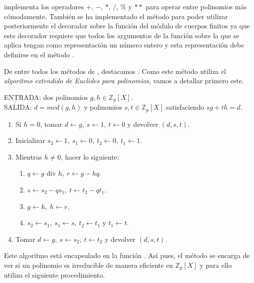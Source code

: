  implementa los operadores  $+$, $-$, $*$, $/$, $\%$ y $**$ para operar entre polinomios más cómodamente. También se ha implementado el método  para poder utilizar posteriormente el decorador  sobre la función  del módulo de cuerpos finitos ya que este decorador requiere que todos los argumentos de la función sobre la que se aplica tengan como representación un número entero y esta representación debe definirse en el método .

De entre todos los métodos de , destacamos . Como este método utiliza el \emph{algoritmo extendido de Euclides para polinomios}, vamos a detallar primero este.
\begin{algoritmo2}
\label{alg:algoritmo extendido de Euclides para polinomios}
    ENTRADA: dos polinomios $g, h \in \mathbb{Z}_p[X]$. \\
    SALIDA: $d = mcd(g, h)$ y polinomios $s, t \in \mathbb{Z}_p[X]$ satisfaciendo $s g + t h= d$.
    \begin{enumerate}
        \item Si $h = 0$, tomar $d \leftarrow g, \ s \leftarrow 1, \ t \leftarrow 0$ y devolver $(d, s, t)$.
        \item Inicializar $s_2 \leftarrow 1, \ s_1 \leftarrow 0, \ t_2 \leftarrow 0,\ t_1 \leftarrow 1$.
        \item Mientras $h \neq 0$, hacer lo siguiente:
        \begin{enumerate}
            \item $q \leftarrow g \textrm{ div } h, \ r \leftarrow g - h q$.
            \item $s \leftarrow s_2 - q s_1, \ t \leftarrow t_2 - q t_1$.
            \item $g \leftarrow h, \ h \leftarrow r$.
            \item $s_2 \leftarrow s_1, \ s_1 \leftarrow s, \ t_2 \leftarrow t_1$ y $t_1 \leftarrow t$.
        \end{enumerate}
        \item Tomar $d \leftarrow g, \ s \leftarrow s_2, \ t \leftarrow t_2$ y devolver $(d, s, t)$.
    \end{enumerate}
\end{algoritmo2}
Este algoritmo está encapsulado en la función . Así pues, el método  se encarga de ver si un polinomio es irreducible de manera eficiente en $\mathbb{Z}_p[X]$ y para ello utiliza el siguiente procedimiento.
